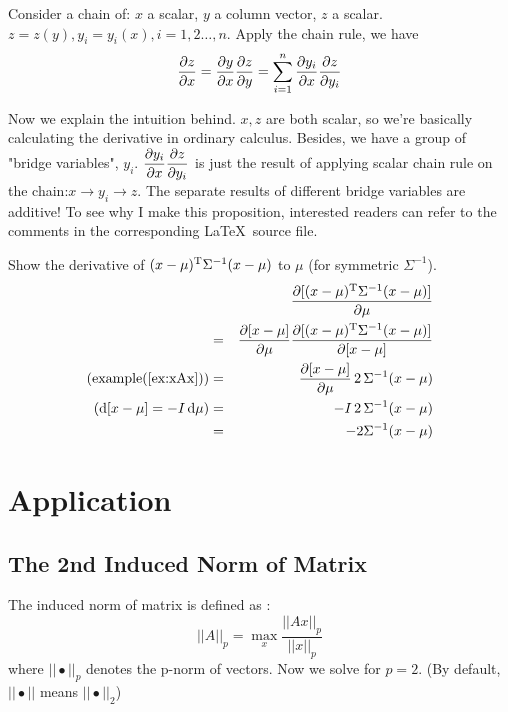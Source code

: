 \begin{myprop}
Consider a chain of: $x$ a scalar, $y$ a column vector, $z$ a scalar. 
$z = z(y), y_i = y_i(x), i=1,2\ldots, n$. Apply the chain rule, we have
	\begin{equation}
		\dfrac{\partial z}{\partial x} = \dfrac{\partial y}{\partial x} \dfrac{\partial z}{\partial y} = 
		\sum_{i=1}^{n}{ \dfrac{\partial y_i}{\partial x} \dfrac{\partial z}{\partial y_i} }
	\end{equation}
\end{myprop}
Now we explain the intuition behind. $x,z$ are both scalar, so 
we're basically calculating the derivative in ordinary calculus. 
Besides, we have a group of "bridge variables", $y_i$. 
$\dfrac{\partial y_i}{\partial x} \dfrac{\partial z}{\partial y_i}$ is just the result of applying 
scalar chain rule on the chain:$x \rightarrow y_i \rightarrow z$. 
The separate results of different bridge variables are additive!
To see why I make this proposition, interested readers can refer 
to the comments in the corresponding \LaTeX ~source file. 

\begin{myex}
	Show the derivative of $(x-\mu)^\mathrm{T}\Sigma^{-1}(x-\mu)$ to $\mu$
	(for symmetric $\Sigma^{-1}$). 
	\begin{eqnarray}
		&&\dfrac{\partial [(x-\mu)^\mathrm{T}\Sigma^{-1}(x-\mu)]}{\partial \mu}  \\
		&=&\dfrac{\partial [x-\mu]}{\partial \mu}\dfrac{\partial [(x-\mu)^\mathrm{T}\Sigma^{-1}(x-\mu)]}{\partial [x-\mu]} \\
	\text{(example(\ref{ex:xAx}))}	&=&\dfrac{\partial [x-\mu]}{\partial \mu}\,2\,\Sigma^{-1}(x-\mu) \\
	(\mathrm{d}[x-\mu] = -I\, \mathrm{d}\mu)	&=&-I\,2\,\Sigma^{-1}(x-\mu) \\
		&=&-2\Sigma^{-1}(x-\mu)
\end{eqnarray}	 
\end{myex}

\section{Application}
\label{sec:application}

\subsection{The 2nd Induced Norm of Matrix}

The induced norm of matrix is defined as \cite{wiki_norm}:
\begin{equation}
	||A||_p = \max_{x}{\frac{||Ax||_p}{||x||_p}}
\end{equation}
where $||\bullet||_p$ denotes the p-norm of vectors. Now we solve 
for $p=2$. (By default, $||\bullet||$ means $||\bullet||_2$)

